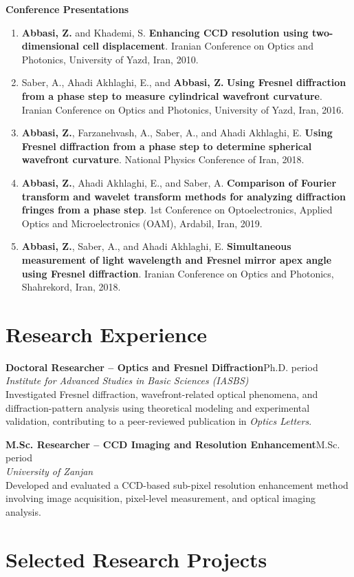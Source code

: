 \documentclass[11pt,a4paper]{article}
\newcommand{\entry}[4]{%
  \textbf{#1}\hfill {\color{light}#2}\\
  \textit{#3}\\[-1pt]
  #4\vspace{3pt}
}
\begin{document}
\textbf{Conference Presentations}
\begin{enumerate}
  \item \textbf{Abbasi, Z.} and Khademi, S. \textbf{Enhancing CCD resolution using two-dimensional cell displacement}. Iranian Conference on Optics and Photonics, University of Yazd, Iran, 2010.
  \item Saber, A., Ahadi Akhlaghi, E., and \textbf{Abbasi, Z.} \textbf{Using Fresnel diffraction from a phase step to measure cylindrical wavefront curvature}. Iranian Conference on Optics and Photonics, University of Yazd, Iran, 2016.
  \item \textbf{Abbasi, Z.}, Farzanehvash, A., Saber, A., and Ahadi Akhlaghi, E. \textbf{Using Fresnel diffraction from a phase step to determine spherical wavefront curvature}. National Physics Conference of Iran, 2018.
  \item \textbf{Abbasi, Z.}, Ahadi Akhlaghi, E., and Saber, A. \textbf{Comparison of Fourier transform and wavelet transform methods for analyzing diffraction fringes from a phase step}. 1st Conference on Optoelectronics, Applied Optics and Microelectronics (OAM), Ardabil, Iran, 2019.
  \item \textbf{Abbasi, Z.}, Saber, A., and Ahadi Akhlaghi, E. \textbf{Simultaneous measurement of light wavelength and Fresnel mirror apex angle using Fresnel diffraction}. Iranian Conference on Optics and Photonics, Shahrekord, Iran, 2018.
\end{enumerate}

\section*{Research Experience}

\entry{Doctoral Researcher -- Optics and Fresnel Diffraction}{Ph.D. period}
{Institute for Advanced Studies in Basic Sciences (IASBS)}
{
Investigated Fresnel diffraction, wavefront-related optical phenomena, and diffraction-pattern analysis using theoretical modeling and experimental validation, contributing to a peer-reviewed publication in \textit{Optics Letters}.
}

\entry{M.Sc. Researcher -- CCD Imaging and Resolution Enhancement}{M.Sc. period}
{University of Zanjan}
{
Developed and evaluated a CCD-based sub-pixel resolution enhancement method involving image acquisition, pixel-level measurement, and optical imaging analysis.
}



\section*{Selected Research Projects}
\end{document}
